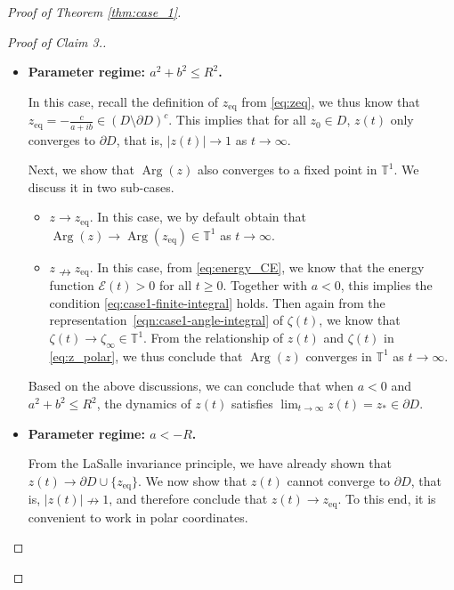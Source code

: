 \documentclass[10pt]{article}
\theoremstyle{definition}
\theoremstyle{definition}
\numberwithin{equation}{section}
\newcommand{\BBT}{\mathbb{T}}
\newcommand{\CE}{\mathcal{E}}
\newcommand{\Arg}{\operatorname{Arg}}
\newcommand{\zeq}{z_{\mathrm{eq}}}
\begin{document}
\begin{proof}[Proof of Theorem \ref{thm:case_1}]
\begin{proof}[Proof of Claim 3.]
        \begin{itemize}
            \item \textbf{Parameter regime: $a^2 + b^2 \leq R^2$.}

            In this case, recall the definition of $\zeq$ from \eqref{eq:zeq}, we thus know that $\zeq = - \frac{c}{a + i b} \in \left( D \setminus \partial D \right)^c$.
            This implies that for all $z_0 \in D$, $z(t)$ only converges to $\partial D$, that is, $|z(t)| \rightarrow 1$ as $t \rightarrow \infty$.
            
            Next, we show that $\Arg(z)$ also converges to a fixed point in $\BBT^1$.
            We discuss it in two sub-cases.
            \begin{itemize}
            \item[1.] $z \rightarrow \zeq$.
            In this case, we by default obtain that $\Arg(z) \rightarrow \Arg(\zeq) \in \BBT^1$ as $t \rightarrow \infty$.

            \item[2.] $z \nrightarrow \zeq$.
            In this case, from \eqref{eq:energy_CE}, we know that the energy function $\CE(t) > 0$ for all $t \geq 0$.
            Together with $a < 0$, this implies the condition \eqref{eq:case1-finite-integral} holds.
            Then again from the representation~\eqref{eqn:case1-angle-integral} of $\zeta(t)$, we know that $\zeta(t) \rightarrow \zeta_{\infty} \in \BBT^1$.
            From the relationship of $z(t)$ and $\zeta(t)$ in \eqref{eq:z_polar}, we thus conclude that $\Arg(z)$ converges in $\BBT^1$ as $t \rightarrow \infty$.
        \end{itemize}
        Based on the above discussions, we can conclude that when $a < 0$ and $a^2 + b^2 \leq R^2$, the dynamics of $z(t)$ satisfies $\lim_{t \rightarrow \infty} z(t) = z_* \in \partial D$.

        \item \textbf{Parameter regime: $a < -R$.}
        
        From the LaSalle invariance principle, we have already shown that $z(t) \rightarrow \partial D \cup \{\zeq\}$.
        We now show that $z(t)$ cannot converge to $\partial D$, that is, $|z(t)| \nrightarrow 1$, and therefore conclude that $z(t) \rightarrow \zeq$.
        To this end, it is convenient to work in polar coordinates.


\end{itemize}
\end{proof}
\end{proof}
\end{document}
